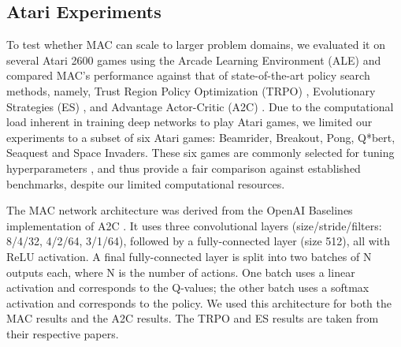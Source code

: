 \documentclass[letterpaper]{article}
\begin{document}
\subsection{Atari Experiments}
To test whether MAC can scale to larger problem domains, we evaluated it on several Atari 2600 games using the Arcade Learning Environment (ALE) \cite{bellemare13arcade} and compared MAC's performance against that of state-of-the-art policy search methods, namely, Trust Region Policy Optimization (TRPO) \cite{schulman2015trust}, Evolutionary Strategies (ES) \cite{salimans2017evolution}, and Advantage Actor-Critic (A2C) \cite{wu2017scalable}. Due to the computational load inherent in training deep networks to play Atari games, we limited our experiments to a subset of six Atari games: Beamrider, Breakout, Pong, Q*bert, Seaquest and Space Invaders. These six games are commonly selected for tuning hyperparameters \cite{mnih2015human,mnih2016asynchronous,wu2017scalable}, and thus provide a fair comparison against established benchmarks, despite our limited computational resources.

The MAC network architecture was derived from the OpenAI Baselines implementation of A2C \cite{wu2017scalable}. It uses three convolutional layers (size/stride/filters: 8/4/32, 4/2/64, 3/1/64), followed by a fully-connected layer (size 512), all with ReLU activation. A final fully-connected layer is split into two batches of N outputs each, where N is the number of actions. One batch uses a linear activation and corresponds to the Q-values; the other batch uses a softmax activation and corresponds to the policy. We used this architecture for both the MAC results and the A2C results. The TRPO and ES results are taken from their respective papers.
\end{document}
